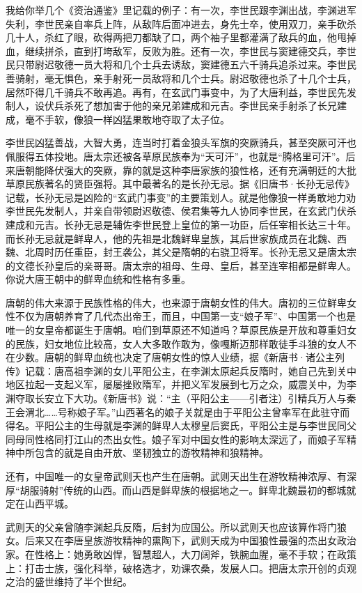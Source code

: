 \par 我给你举几个《资治通鉴》里记载的例子：有一次，李世民跟李渊出战，李渊进军失利，李世民亲自率兵上阵，从敌阵后面冲进去，身先士卒，使用双刀，亲手砍杀几十人，杀红了眼，砍得两把刀都缺了口，两个袖子里都灌满了敌兵的血，他甩掉血，继续拼杀，直到打垮敌军，反败为胜。还有一次，李世民与窦建德交兵，李世民只带尉迟敬德一员大将和几个士兵去诱敌，窦建德五六千骑兵追杀过来。李世民善骑射，毫无惧色，亲手射死一员敌将和几个士兵。尉迟敬德也杀了十几个士兵，居然吓得几千骑兵不敢再追。再有，在玄武门事变中，为了大唐利益，李世民先发制人，设伏兵杀死了想加害于他的亲兄弟建成和元吉。李世民亲手射杀了长兄建成，毫不手软，像狼一样凶猛果敢地夺取了太子位。
\par 李世民凶猛善战，大智大勇，连当时打着金狼头军旗的突厥骑兵，甚至突厥可汗也佩服得五体投地。唐太宗还被各草原民族奉为“天可汗”，也就是“腾格里可汗”。后来唐朝能降伏强大的突厥，靠的就是这种李唐家族的狼性格，还有充满朝廷的大批草原民族著名的贤臣强将。其中最著名的是长孙无忌。据《旧唐书·长孙无忌传》记载，长孙无忌是凶险的“玄武门事变”的主要策划人。就是他像狼一样勇敢地力劝李世民先发制人，并亲自带领尉迟敬德、侯君集等九人协同李世民，在玄武门伏杀建成和元吉。长孙无忌是辅佐李世民登上皇位的第一功臣，后任宰相长达三十年。而长孙无忌就是鲜卑人，他的先祖是北魏鲜卑皇族，其后世家族成员在北魏、西魏、北周时历任重臣，封王袭公，其父是隋朝的右骁卫将军。长孙无忌又是唐太宗的文德长孙皇后的亲哥哥。唐太宗的祖母、生母、皇后，甚至连宰相都是鲜卑人。你说大唐王朝中的鲜卑血统和性格有多重。
\par 唐朝的伟大来源于民族性格的伟大，也来源于唐朝女性的伟大。唐初的三位鲜卑女性不仅为唐朝养育了几代杰出帝王，而且，中国第一支“娘子军”、中国第一个也是唯一的女皇帝都诞生于唐朝。咱们到草原还不知道吗？草原民族是开放和尊重妇女的民族，妇女地位比较高，女人大多敢作敢为，像嘎斯迈那样敢徒手斗狼的女人不在少数。唐朝的鲜卑血统也决定了唐朝女性的惊人业绩，据《新唐书·诸公主列传》记载：唐高祖李渊的女儿平阳公主，在李渊太原起兵反隋时，她自己先到关中地区拉起一支起义军，屡屡挫败隋军，并把义军发展到七万之众，威震关中，为李渊夺取长安立下大功。《新唐书》说：“主（平阳公主——引者注）引精兵万人与秦王会渭北……号称娘子军。”山西著名的娘子关就是由于平阳公主曾率军在此驻守而得名。平阳公主的生母就是李渊的鲜卑人太穆皇后窦氏，平阳公主是与李世民同父同母同性格同打江山的杰出女性。娘子军对中国女性的影响太深远了，而娘子军精神中所包含的就是自由开放、坚韧独立的游牧精神和狼精神。
\par 还有，中国唯一的女皇帝武则天也产生在唐朝。武则天出生在游牧精神浓厚、有深厚“胡服骑射”传统的山西。而山西是鲜卑族的根据地之一。鲜卑北魏最初的都城就定在山西平城。
\par 武则天的父亲曾随李渊起兵反隋，后封为应国公。所以武则天也应该算作将门狼女。后来又在李唐皇族游牧精神的熏陶下，武则天成为中国狼性最强的杰出女政治家。在性格上：她勇敢凶悍，智慧超人，大刀阔斧，铁腕血腥，毫不手软；在政策上：打击士族，强化科举，破格选才，劝课农桑，发展人口。把唐太宗开创的贞观之治的盛世维持了半个世纪。
